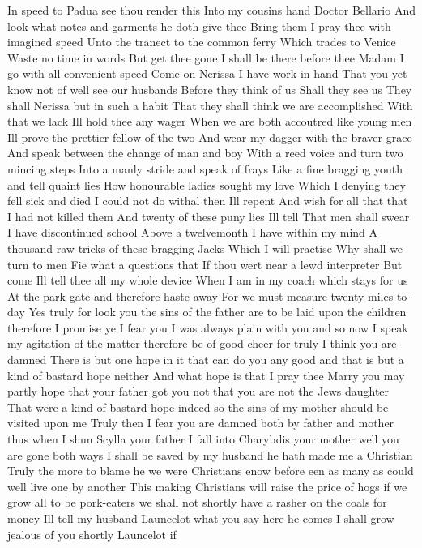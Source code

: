In speed to Padua see thou render this
Into my cousins hand Doctor Bellario
And look what notes and garments he doth give thee
Bring them I pray thee with imagined speed
Unto the tranect to the common ferry
Which trades to Venice Waste no time in words
But get thee gone I shall be there before thee
Madam I go with all convenient speed
Come on Nerissa I have work in hand
That you yet know not of well see our husbands
Before they think of us
Shall they see us
They shall Nerissa but in such a habit
That they shall think we are accomplished
With that we lack Ill hold thee any wager
When we are both accoutred like young men
Ill prove the prettier fellow of the two
And wear my dagger with the braver grace
And speak between the change of man and boy
With a reed voice and turn two mincing steps
Into a manly stride and speak of frays
Like a fine bragging youth and tell quaint lies
How honourable ladies sought my love
Which I denying they fell sick and died
I could not do withal then Ill repent
And wish for all that that I had not killed them
And twenty of these puny lies Ill tell
That men shall swear I have discontinued school
Above a twelvemonth I have within my mind
A thousand raw tricks of these bragging Jacks
Which I will practise
Why shall we turn to men
Fie what a questions that
If thou wert near a lewd interpreter
But come Ill tell thee all my whole device
When I am in my coach which stays for us
At the park gate and therefore haste away
For we must measure twenty miles to-day
Yes truly for look you the sins of the father
are to be laid upon the children therefore I
promise ye I fear you I was always plain with
you and so now I speak my agitation of the matter
therefore be of good cheer for truly I think you
are damned There is but one hope in it that can do
you any good and that is but a kind of bastard
hope neither
And what hope is that I pray thee
Marry you may partly hope that your father got you
not that you are not the Jews daughter
That were a kind of bastard hope indeed so the
sins of my mother should be visited upon me
Truly then I fear you are damned both by father and
mother thus when I shun Scylla your father I
fall into Charybdis your mother well you are
gone both ways
I shall be saved by my husband he hath made me a
Christian
Truly the more to blame he we were Christians
enow before een as many as could well live one by
another This making Christians will raise the
price of hogs if we grow all to be pork-eaters we
shall not shortly have a rasher on the coals for money
Ill tell my husband Launcelot what you say here he comes
I shall grow jealous of you shortly Launcelot if
